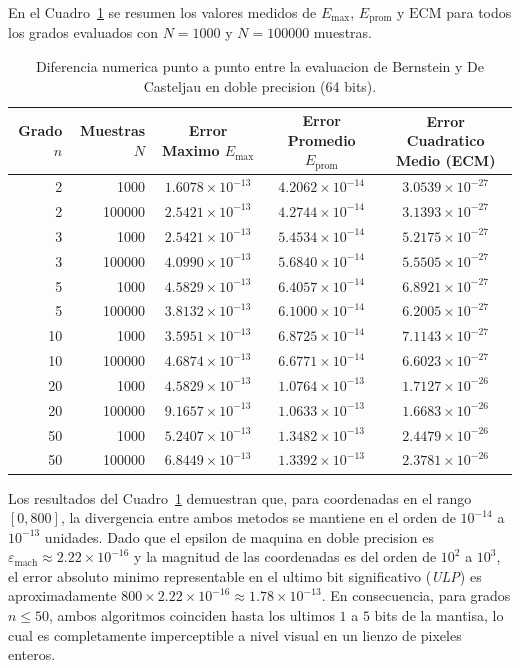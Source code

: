 En el Cuadro~\ref{tab:comp_diferencias} se resumen los valores medidos de $E_{\max}$, $E_{\text{prom}}$ y $\text{ECM}$ para todos los grados evaluados con $N = 1000$ y $N = 100000$ muestras.

\begin{table}[H]
\centering
\caption{Diferencia numerica punto a punto entre la evaluacion de Bernstein y De Casteljau en doble precision (64 bits).}
\label{tab:comp_diferencias}
\begin{tabular}{rr ccc}
\toprule
\textbf{Grado $n$} & \textbf{Muestras $N$} & \textbf{Error Maximo $E_{\max}$} & \textbf{Error Promedio $E_{\text{prom}}$} & \textbf{Error Cuadratico Medio (ECM)} \\
\midrule
2  & 1000   & $1.6078 \times 10^{-13}$ & $4.2062 \times 10^{-14}$ & $3.0539 \times 10^{-27}$ \\
2  & 100000 & $2.5421 \times 10^{-13}$ & $4.2744 \times 10^{-14}$ & $3.1393 \times 10^{-27}$ \\
3  & 1000   & $2.5421 \times 10^{-13}$ & $5.4534 \times 10^{-14}$ & $5.2175 \times 10^{-27}$ \\
3  & 100000 & $4.0990 \times 10^{-13}$ & $5.6840 \times 10^{-14}$ & $5.5505 \times 10^{-27}$ \\
5  & 1000   & $4.5829 \times 10^{-13}$ & $6.4057 \times 10^{-14}$ & $6.8921 \times 10^{-27}$ \\
5  & 100000 & $3.8132 \times 10^{-13}$ & $6.1000 \times 10^{-14}$ & $6.2005 \times 10^{-27}$ \\
10 & 1000   & $3.5951 \times 10^{-13}$ & $6.8725 \times 10^{-14}$ & $7.1143 \times 10^{-27}$ \\
10 & 100000 & $4.6874 \times 10^{-13}$ & $6.6771 \times 10^{-14}$ & $6.6023 \times 10^{-27}$ \\
20 & 1000   & $4.5829 \times 10^{-13}$ & $1.0764 \times 10^{-13}$ & $1.7127 \times 10^{-26}$ \\
20 & 100000 & $9.1657 \times 10^{-13}$ & $1.0633 \times 10^{-13}$ & $1.6683 \times 10^{-26}$ \\
50 & 1000   & $5.2407 \times 10^{-13}$ & $1.3482 \times 10^{-13}$ & $2.4479 \times 10^{-26}$ \\
50 & 100000 & $6.8449 \times 10^{-13}$ & $1.3392 \times 10^{-13}$ & $2.3781 \times 10^{-26}$ \\
\bottomrule
\end{tabular}
\end{table}

Los resultados del Cuadro~\ref{tab:comp_diferencias} demuestran que, para coordenadas en el rango $[0, 800]$, la divergencia entre ambos metodos se mantiene en el orden de $10^{-14}$ a $10^{-13}$ unidades. Dado que el epsilon de maquina en doble precision es $\varepsilon_{\text{mach}} \approx 2.22 \times 10^{-16}$ y la magnitud de las coordenadas es del orden de $10^2$ a $10^3$, el error absoluto minimo representable en el ultimo bit significativo (\textit{ULP}) es aproximadamente $800 \times 2.22 \times 10^{-16} \approx 1.78 \times 10^{-13}$. En consecuencia, para grados $n \le 50$, ambos algoritmos coinciden hasta los ultimos $1$ a $5$ bits de la mantisa, lo cual es completamente imperceptible a nivel visual en un lienzo de pixeles enteros.

